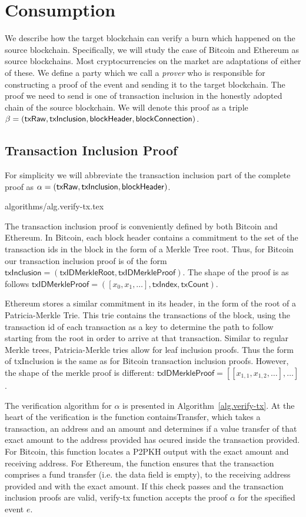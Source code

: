 \section{Consumption}

We describe how the target blockchain can verify a burn which happened on the source blockchain. Specifically, we will study the case of Bitcoin and Ethereum as source blockchains. Most cryptocurrencies on the market are adaptations of either of these. We define a party which we call a \emph{prover} who is responsible for constructing a proof of the event and sending it to the target blockchain. The proof we need to send is one of transaction inclusion in the honestly adopted chain of the source blockchain. We will denote this proof as a triple $\beta = \sf(txRaw, txInclusion, blockHeader, blockConnection)$.

\subsection{Transaction Inclusion Proof}

For simplicity we will abbreviate the transaction inclusion part of the complete proof as $\alpha = \sf(txRaw, txInclusion, blockHeader)$.

{algorithms/alg.verify-tx.tex}

The transaction inclusion proof is conveniently defined by both Bitcoin and Ethereum. In Bitcoin, each block header contains a commitment to the set of the transaction ids in the block in the form of a Merkle Tree root. Thus, for Bitcoin our transaction inclusion proof is of the form $\mathsf{txInclusion} = (\mathsf{txIDMerkleRoot}, \mathsf{txIDMerkleProof})$. The shape of the proof is as follows $\mathsf{txIDMerkleProof} = ([x_0, x_1, \dots], \mathsf{txIndex}, \mathsf{txCount})$.

Ethereum stores a similar commitment in its header, in the form of the root of a Patricia-Merkle Trie. This trie contains the transactions of the block, using the transaction id of each transaction as a key to determine the path to follow starting from the root in order to arrive at that transaction. Similar to regular Merkle trees, Patricia-Merkle tries allow for leaf inclusion proofs. Thus the form of \textsf{txInclusion} is the same as for Bitcoin transaction inclusion proofs. However, the shape of the merkle proof is different: $\mathsf{txIDMerkleProof} = [[x_{1,1}, x_{1,2}, \dots], \dots]$.

The verification algorithm for $\alpha$ is presented in Algorithm~\ref{alg.verify-tx}. At the heart of the verification is the function \textsf{containsTransfer}, which takes a transaction, an address and an amount and determines if a value transfer of that exact amount to the address provided has ocured inside the transaction provided. For Bitcoin, this function locates a P2PKH output with the exact amount and receiving address. For Ethereum, the function ensures that the transaction comprises a fund transfer (i.e. the \textsf{data} field is empty), to the receiving address provided and with the exact amount. If this check passes and the transaction inclusion proofs are valid, \textsf{verify-tx} function accepts the proof $\alpha$ for the specified event $e$.

